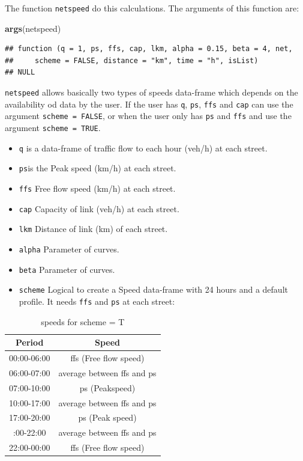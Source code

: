 \documentclass[12pt,graybox,envcountchap,sectrefs]{krantz}
\makeatletter
\newenvironment{Shaded}{\begin{snugshade}}{\end{snugshade}}
\newcommand{\KeywordTok}[1]{\textcolor[rgb]{0.13,0.29,0.53}{\textbf{#1}}}
\newcommand{\NormalTok}[1]{#1}
\providecommand{\tightlist}{%
  \setlength{\itemsep}{0pt}\setlength{\parskip}{0pt}}
\newenvironment{kframe}{%
\medskip{}
\setlength{\fboxsep}{.8em}
 \def\at@end@of@kframe{}%
 \ifinner\ifhmode%
  \def\at@end@of@kframe{\end{minipage}}%
  \begin{minipage}{\columnwidth}%
 \fi\fi%
 \def\FrameCommand##1{\hskip\@totalleftmargin \hskip-\fboxsep
 \colorbox{shadecolor}{##1}\hskip-\fboxsep
     \hskip-\linewidth \hskip-\@totalleftmargin \hskip\columnwidth}%
 \MakeFramed {\advance\hsize-\width
   \@totalleftmargin\z@ \linewidth\hsize
   \@setminipage}}%
 {\par\unskip\endMakeFramed%
 \at@end@of@kframe}
\renewenvironment{Shaded}{\begin{kframe}}{\end{kframe}}
\theoremstyle{definition}
\theoremstyle{definition}
\theoremstyle{definition}
\theoremstyle{remark}
\makeatother
\begin{document}
The function \texttt{netspeed} do this calculations. The arguments of
this function are:

\begin{Shaded}
\begin{Highlighting}[]
\KeywordTok{args}\NormalTok{(netspeed)}
\end{Highlighting}
\end{Shaded}

\begin{verbatim}
## function (q = 1, ps, ffs, cap, lkm, alpha = 0.15, beta = 4, net, 
##     scheme = FALSE, distance = "km", time = "h", isList) 
## NULL
\end{verbatim}

\texttt{netspeed} allows basically two types of speeds data-frame which
depends on the availability od data by the user. If the user has
\texttt{q}, \texttt{ps}, \texttt{ffs} and \texttt{cap} can use the
argument \texttt{scheme\ =\ FALSE}, or when the user only has
\texttt{ps} and \texttt{ffs} and use the argument
\texttt{scheme\ =\ TRUE}.

\begin{itemize}
\tightlist
\item
  \texttt{q} is a data-frame of traffic flow to each hour (veh/h) at
  each street.
\item
  \texttt{ps}is the Peak speed (km/h) at each street.
\item
  \texttt{ffs} Free flow speed (km/h) at each street.
\item
  \texttt{cap} Capacity of link (veh/h) at each street.
\item
  \texttt{lkm} Distance of link (km) of each street.
\item
  \texttt{alpha} Parameter of \citet{bpr} curves.
\item
  \texttt{beta} Parameter of \citet{bpr} curves.
\item
  \texttt{scheme} Logical to create a Speed data-frame with 24 hours and
  a default profile. It needs \texttt{ffs} and \texttt{ps} at each
  street:
\end{itemize}

\begin{table}

\caption{\label{tab:unnamed-chunk-46}speeds for scheme = T}
\centering
\begin{tabular}[t]{cc}
\toprule
Period & Speed\\
\midrule
00:00-06:00 & ffs (Free flow speed)\\
06:00-07:00 & average between ffs and ps\\
07:00-10:00 & ps (Peakspeed)\\
10:00-17:00 & average between ffs and ps\\
17:00-20:00 & ps (Peak speed)\\
\addlinespace
20:00-22:00 & average between ffs and ps\\
22:00-00:00 & ffs (Free flow speed)\\
\bottomrule
\end{tabular}
\end{table}
\end{document}
